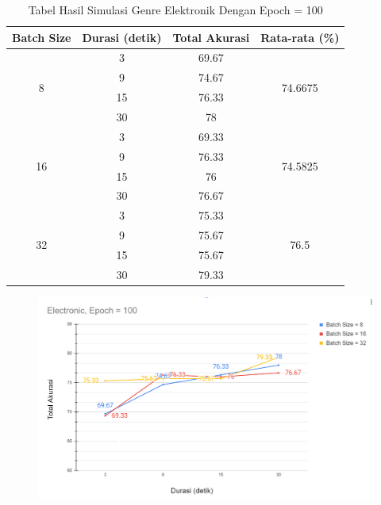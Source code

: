 \begin{enumerate}
		\begin{longtable}[c]{|c|c|c|c|}
			\caption{Tabel Hasil Simulasi Genre Elektronik Dengan Epoch = 100}
			\label{tab:my-table}\\
			\hline
			\textbf{Batch Size} & \textbf{Durasi (detik)} & \textbf{Total Akurasi} & \textbf{Rata-rata (\%)}       \\ \hline
			\endfirsthead
			\endhead
			\multirow{4}{*}{8}  & 3                       & 69.67                  & \multirow{4}{*}{74.6675} \\ \cline{2-3}
			& 9                       & 74.67                  &                          \\ \cline{2-3}
			& 15                      & 76.33                  &                          \\ \cline{2-3}
			& 30                      & 78                     &                          \\ \hline
			\multirow{4}{*}{16} & 3                       & 69.33                  & \multirow{4}{*}{74.5825} \\ \cline{2-3}
			& 9                       & 76.33                  &                          \\ \cline{2-3}
			& 15                      & 76                     &                          \\ \cline{2-3}
			& 30                      & 76.67                  &                          \\ \hline
			\multirow{4}{*}{32} & 3                       & 75.33                  & \multirow{4}{*}{76.5}    \\ \cline{2-3}
			& 9                       & 75.67                  &                          \\ \cline{2-3}
			& 15                      & 75.67                  &                          \\ \cline{2-3}
			& 30                      & 79.33                  &                          \\ \hline
		\end{longtable}
		
		\begin{figure}[H]
			\centering
			
			\includegraphics[width=\textwidth]{gambar/e100_chart_sum accuracy_electronic}
			

\end{figure}
\end{enumerate}
